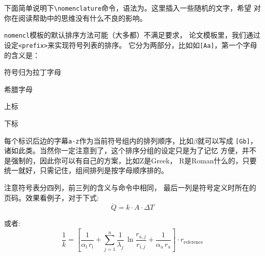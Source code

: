 下面简单说明下\verb|\nomenclature|命令，语法为。这里插入一些随机的文字，希望
对你在阅读帮助中的思维没有什么不良的影响。
\begin{code}
\end{code}
\verb|nomencl|模板的默认排序方法可能（大多都）不满足要求，
论文模板里，我们通过设定\verb|<prefix>|来实现符号列表的排序。
它分为两部分，比如如\verb|[Aa]|，第一个字母的含义是：
\begin{compactitem}
\item[`A'] 符号归为拉丁字母
\item[`G'] 希腊字母
\item[`X'] 上标
\item[`Z'] 下标
\end{compactitem}
每个标识后边的字幕\verb|a-z|作为当前符号组内的排列顺序，比如$\beta$就可以写成
\verb|[Gb]|，诸如此类。当然你一定注意到了，这个排序分组的设定只是为了记忆
方便，并不是强制的，因此你可以有自己的方案，比如Z是Greek，
R是Roman什么的，只要统一就好，只需记住，组间排列是按字母顺序排的。

注意符号表分四列，前三列的含义与命令中相同，
最后一列是符号定义时所在的页码。效果看例子，对于下式:
\begin{equation}\label{eq:heatflux}
   \dot{Q} = k \cdot A \cdot \Delta T
\end{equation}%
%
%
%
%
%
%
%

或者:
\begin{equation}\label{eq:ohtc}
    \frac{1}{k} = \left[\frac{1}{\alpha _{\mathrm{i}}\,r_{\mathrm{i}}} +
    \sum^n_{j=1}\frac{1}{\lambda _j}\,
    \ln \frac{r_{\mathrm{a},j}}{r_{\mathrm{i},j}} +
    \frac{1}{\alpha _{\mathrm{a}}\,
    r_{\mathrm{a}}}\right] \cdot r_{\mathrm{reference}}
\end{equation}%
%
%
%
%
%
%

